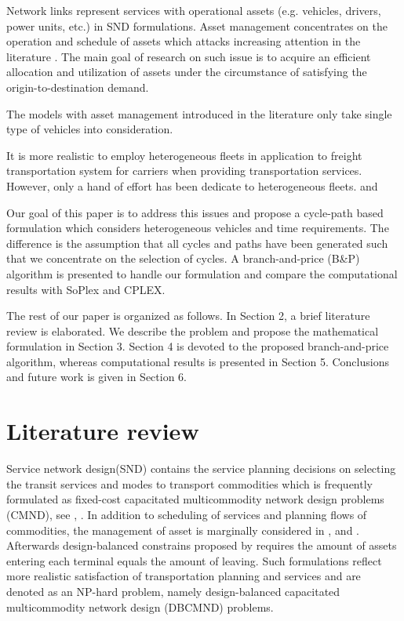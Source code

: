 \documentclass[11pt,nonblindrev,fleqn]{article}
\begin{document}
Network links represent services with operational assets (e.g. vehicles, drivers, power units, etc.) in SND formulations. Asset management concentrates on the operation and schedule of assets which attacks increasing attention in the literature \citep{Andersen2009bService,Andersen2011Branch}. The main goal of research on such issue is to acquire an efficient allocation and utilization of assets under the circumstance of satisfying the origin-to-destination demand.

The models with asset management introduced in the literature only take single type of vehicles into consideration. 

It is more realistic to employ heterogeneous fleets in application to freight transportation system for carriers when providing transportation services. However, only a hand of effort has been dedicate to heterogeneous fleets. \cite{Kim1999Multimodal} and

Our goal of this paper is to address this issues and propose a cycle-path based formulation \citep{Andersen2009bService} which considers heterogeneous vehicles and time requirements. The difference is the assumption that all cycles and paths have been generated such that we concentrate on the selection of cycles. A branch-and-price (B\&P) algorithm is presented to handle our formulation and compare the computational results with SoPlex and CPLEX.

The rest of our paper is organized as follows. In Section 2, a brief literature review is elaborated. We describe the problem and propose the mathematical formulation in Section 3. Section 4 is devoted to the proposed branch-and-price algorithm, whereas computational results is presented in Section 5. Conclusions and future work is given in Section 6.


\section{Literature review}
Service network design(SND) contains the service planning decisions on selecting the transit services and modes to transport commodities which is frequently formulated as fixed-cost capacitated multicommodity network design problems (CMND), see \cite{Magnanti1984Network}, \cite{Minoux1989Networks}. In addition to scheduling of services and planning flows of commodities, the management of asset is marginally considered in \cite{Crainic2000Service}, \cite{Smilowitz2002Deferred} and \cite{crainic2003long}. Afterwards design-balanced constrains proposed by \cite{Pedersen2009Models} requires the amount of assets entering each terminal equals the amount of leaving. Such formulations reflect more realistic satisfaction of transportation planning and services and are denoted as an NP-hard problem, namely design-balanced capacitated multicommodity network design (DBCMND) problems.
\end{document}
